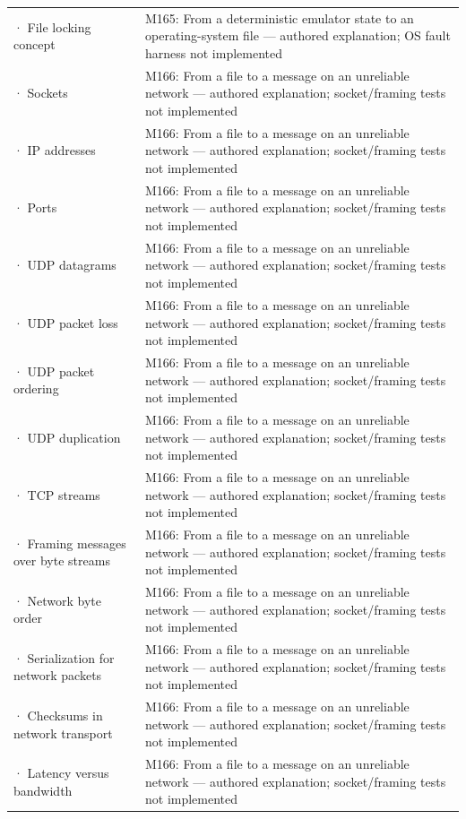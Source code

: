 {\begin{longtable}[]{@{}
  >{\raggedright\arraybackslash}p{}
  >{\raggedright\arraybackslash}p{}@{}}
2755 · File locking concept & M165: From a deterministic emulator state to an operating-system file --- authored explanation; OS fault harness not implemented \\
2756 · Sockets & M166: From a file to a message on an unreliable network --- authored explanation; socket/framing tests not implemented \\
2757 · IP addresses & M166: From a file to a message on an unreliable network --- authored explanation; socket/framing tests not implemented \\
2758 · Ports & M166: From a file to a message on an unreliable network --- authored explanation; socket/framing tests not implemented \\
2759 · UDP datagrams & M166: From a file to a message on an unreliable network --- authored explanation; socket/framing tests not implemented \\
2760 · UDP packet loss & M166: From a file to a message on an unreliable network --- authored explanation; socket/framing tests not implemented \\
2761 · UDP packet ordering & M166: From a file to a message on an unreliable network --- authored explanation; socket/framing tests not implemented \\
2762 · UDP duplication & M166: From a file to a message on an unreliable network --- authored explanation; socket/framing tests not implemented \\
2763 · TCP streams & M166: From a file to a message on an unreliable network --- authored explanation; socket/framing tests not implemented \\
2764 · Framing messages over byte streams & M166: From a file to a message on an unreliable network --- authored explanation; socket/framing tests not implemented \\
2765 · Network byte order & M166: From a file to a message on an unreliable network --- authored explanation; socket/framing tests not implemented \\
2766 · Serialization for network packets & M166: From a file to a message on an unreliable network --- authored explanation; socket/framing tests not implemented \\
2767 · Checksums in network transport & M166: From a file to a message on an unreliable network --- authored explanation; socket/framing tests not implemented \\
2768 · Latency versus bandwidth & M166: From a file to a message on an unreliable network --- authored explanation; socket/framing tests not implemented \\

\end{longtable}}
